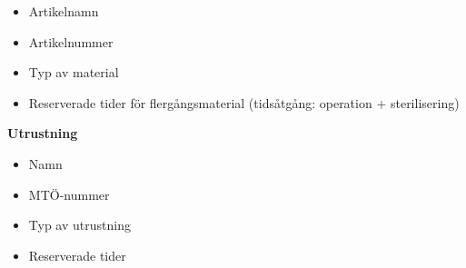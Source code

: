\begin{itemize}
    \item Artikelnamn
    \item Artikelnummer
    \item Typ av material
    \item Reserverade tider för flergångsmaterial (tidsåtgång: operation + sterilisering)
\end{itemize}

\textbf{Utrustning}
\begin{itemize}
    \item Namn
    \item MTÖ-nummer
    \item Typ av utrustning
    \item Reserverade tider
\end{itemize}
